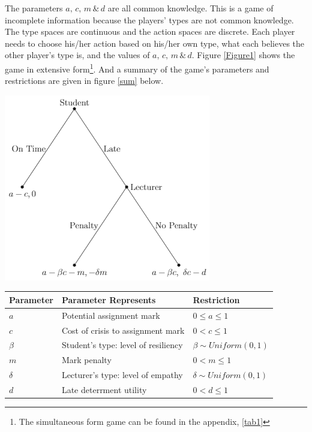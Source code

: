\documentclass[11pt,preprint, authoryear]{elsarticle}
\let\origfigure\figure
\let\endorigfigure\endfigure
\renewenvironment{figure}[1][2] {
    \expandafter\origfigure\expandafter[H]
} {
    \endorigfigure
}
\let\origtable\table
\let\endorigtable\endtable
\renewenvironment{table}[1][2] {
    \expandafter\origtable\expandafter[H]
} {
    \endorigtable
}
\numberwithin{equation}{section}
\numberwithin{figure}{section}
\numberwithin{table}{section}
\let\rmarkdownfootnote\footnote%
\def\footnote{\protect\rmarkdownfootnote}
\begin{document}
The parameters \(a,\, c,\, m\, \&\, d\) are all common knowledge. This
is a game of incomplete information because the players' types are not
common knowledge. The type spaces are continuous and the action spaces
are discrete. Each player needs to choose his/her action based on
his/her own type, what each believes the other player's type is, and the
values of \(a,\, c,\, m\, \&\, d\). Figure \ref{Figure1} shows the game
in extensive form\footnote{The simultaneous form game can be found in
  the appendix, \ref{tab1}}. And a summary of the game's parameters and
restrictions are given in figure \ref{sum} below.

\begin{figure}[H]

{\centering \includegraphics{img/tree} 

}

\caption{This game is a dynamic game where nature first chooses the student's and lecturer's types. Then the student moves, deciding to hand in on time or late after experiencing a crisis. If the student hands in late, the lecturer decides to impose a penalty or not. \label{Figure1}}\label{fig:Figure1}
\end{figure}

\begin{table}[H]
\centering
\begin{tabular}{lll}
  \toprule
Parameter & Parameter Represents & Restriction \\ 
  \midrule
$a$ & Potential assignment mark & $0\leq a \leq 1$ \\ 
  $c$ & Cost of crisis to assignment mark & $0 < c \leq 1$ \\ 
  $\beta$ & Student's type: level of resiliency & $\beta \sim Uniform(0,1)$  \\ 
  $m$ & Mark penalty & $0 < m \leq 1$ \\ 
  $\delta$ & Lecturer's type: level of empathy & $\delta \sim Uniform(0,1)$ \\ 
  $d$ & Late deterrment utility & $0<d \leq 1$ \\ 
   \bottomrule
\end{tabular}
\caption{Game Parameters \label{sum}} 
\end{table}
\end{document}
